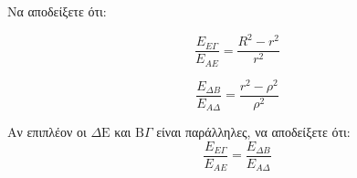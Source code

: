 \begin{alist}
\item Να αποδείξετε ότι:
  \begin{rlist}
  \item \[ \frac{E_{E\Gamma}}{E_{AE}} = \frac{R^2-r^2}{r^2} \] 
  \item \[ \frac{E_{\Delta B}}{E_{A\Delta}} = \frac{r^2-\rho^2}{\rho^2} \] 
  \end{rlist}
\item Αν επιπλέον οι $\Delta \text{E}$ και $\text{B}\Gamma$ είναι παράλληλες, να αποδείξετε ότι:
  \[ \frac{E_{E\Gamma}}{E_{AE}} = \frac{E_{\Delta B}}{E_{A\Delta}} \] 
\end{alist}